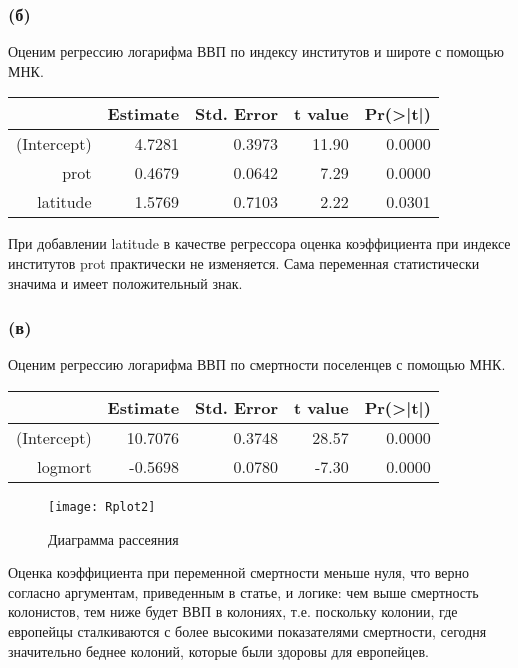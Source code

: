 \documentclass[a4paper,12pt]{article} %
\begin{document}
	
	
\subsubsection*{(б)}	

Оценим регрессию логарифма ВВП по индексу институтов и широте  с помощью МНК.


\begin{table}[h!]
	\centering
	\begin{tabular}{rrrrr}
		\hline
		& Estimate & Std. Error & t value & Pr(>|t|) \\ 
		\hline
		(Intercept) & 4.7281 & 0.3973 & 11.90 & 0.0000 \\ 
		prot & 0.4679 & 0.0642 & 7.29 & 0.0000 \\ 
		latitude & 1.5769 & 0.7103 & 2.22 & 0.0301 \\ 
		\hline
	\end{tabular}
\end{table}


При добавлении latitude в качестве регрессора  
оценка коэффициента при индексе институтов prot практически не изменяется. Сама переменная статистически значима и имеет положительный знак.



\subsubsection*{(в)}	

Оценим регрессию логарифма ВВП по смертности поселенцев  с помощью МНК.

\begin{table}[h!]
	\centering
	\begin{tabular}{rrrrr}
		\hline
		& Estimate & Std. Error & t value & Pr(>|t|) \\ 
		\hline
		(Intercept) & 10.7076 & 0.3748 & 28.57 & 0.0000 \\ 
		logmort & -0.5698 & 0.0780 & -7.30 & 0.0000 \\ 
		\hline
	\end{tabular}
\end{table}

\begin{figure}[h!]
	\centering
	\texttt{[image: Rplot2]}
	\caption[Диаграмма рассеяния]{Диаграмма рассеяния}
	\label{fig:rplot1}
\end{figure}

Оценка коэффициента при переменной смертности меньше нуля, что верно согласно аргументам, приведенным в статье,  и логике: чем выше смертность колонистов, тем ниже будет ВВП в колониях, т.е. поскольку колонии, где европейцы сталкиваются с более высокими показателями смертности, сегодня значительно беднее колоний, которые были здоровы для европейцев. 
\end{document}
